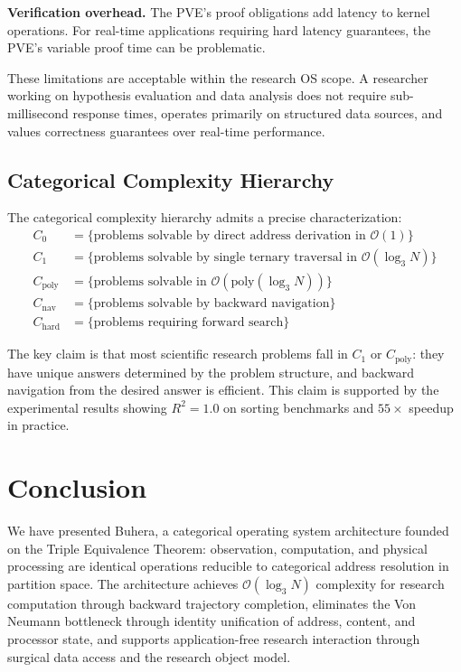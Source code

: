 \documentclass[12pt,twocolumn]{article}
\begin{document}
\textbf{Verification overhead.} The PVE's proof obligations add latency to kernel operations. For real-time applications requiring hard latency guarantees, the PVE's variable proof time can be problematic.

These limitations are acceptable within the research OS scope. A researcher working on hypothesis evaluation and data analysis does not require sub-millisecond response times, operates primarily on structured data sources, and values correctness guarantees over real-time performance.

\subsection{Categorical Complexity Hierarchy}

The categorical complexity hierarchy admits a precise characterization:
\begin{align}
C_0 &= \{\text{problems solvable by direct address derivation in } \mathcal{O}(1)\} \\
C_1 &= \{\text{problems solvable by single ternary traversal in } \mathcal{O}(\log_3 N)\} \\
C_{\text{poly}} &= \{\text{problems solvable in } \mathcal{O}(\text{poly}(\log_3 N))\} \\
C_{\text{nav}} &= \{\text{problems solvable by backward navigation}\} \\
C_{\text{hard}} &= \{\text{problems requiring forward search}\}
\end{align}

The key claim is that most scientific research problems fall in $C_1$ or $C_{\text{poly}}$: they have unique answers determined by the problem structure, and backward navigation from the desired answer is efficient. This claim is supported by the experimental results showing $R^2 = 1.0$ on sorting benchmarks and $55\times$ speedup in practice.

\section{Conclusion}
\label{sec:conclusion}

We have presented Buhera, a categorical operating system architecture founded on the Triple Equivalence Theorem: observation, computation, and physical processing are identical operations reducible to categorical address resolution in partition space. The architecture achieves $\mathcal{O}(\log_3 N)$ complexity for research computation through backward trajectory completion, eliminates the Von Neumann bottleneck through identity unification of address, content, and processor state, and supports application-free research interaction through surgical data access and the research object model.
\end{document}
